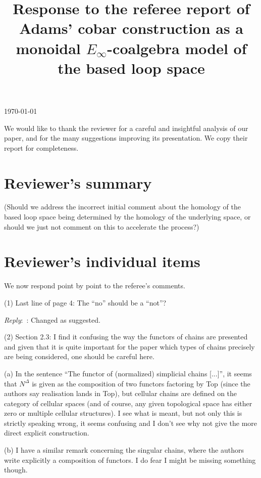 \documentclass{amsart}
\title[Referee reply]{Response to the referee report of \\ Adams' cobar construction as a monoidal $E_{\infty}$-coalgebra model of the based loop space}
\newcommand{\ar}{\medskip\noindent\textit{Reply}:\ }
\newcommand{\rp}{\medskip\noindent}
\begin{document}
	\noindent\today
	\maketitle

	We would like to thank the reviewer for a careful and insightful analysis of our paper, and for the many suggestions improving its presentation.
	We copy their report for completeness.

	\section{Reviewer's summary}

	(Should we address the incorrect initial comment about the homology of the based loop space being determined by the homology of the underlying space, or should we just not comment on this to accelerate the process?)


	\section{Reviewer's individual items}

	\noindent We now respond point by point to the referee's comments.

	\rp (1) Last line of page 4: The “no” should be a “not”?

	\ar: Changed as suggested.

	\rp (2) Section 2.3: I find it confusing the way the functors of chains are presented
	and given that it is quite important for the paper which types of chains
	precisely are being considered, one should be careful here.

	\rp (a) In the sentence “The functor of (normalized) simplicial chains [...]”, it seems that $N^\Delta$ is given as the composition of two functors factoring by Top (since the authors say realisation lands in Top), but cellular chains are defined on the category of cellular spaces (and of course, any
	given topological space has either zero or multiple cellular structures).
	I see what is meant, but not only this is strictly speaking wrong, it seems confusing and I don’t see why not give the more direct explicit construction.

	\rp (b) I have a similar remark concerning the singular chains, where the authors write explicitly a composition of functors.
	I do fear I might be missing something though.
\end{document}
